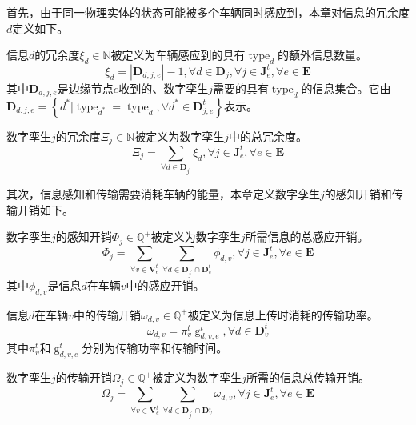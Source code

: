 首先，由于同一物理实体的状态可能被多个车辆同时感应到，本章对信息的冗余度$d$定义如下。
\begin{definition}
信息$d$的冗余度$\xi_d \in \mathbb{N}$被定义为车辆感应到的具有$\operatorname{type}_d$的额外信息数量。
\begin{equation}
    \xi_d= \left | \mathbf{D}_{d, j, e} \right| - 1, \forall d \in \mathbf{D}_j, \forall j \in \mathbf{J}_{e}^{t}, \forall e \in \mathbf{E}
\end{equation}
\noindent 其中$\mathbf{D}_{d, j, e}$是边缘节点$e$收到的、数字孪生$j$需要的具有$\operatorname{type}_d$的信息集合。它由$\mathbf{D}_{d, j, e}=\left\{ d^* \vert \operatorname{type}_{d^*} = \operatorname{type}_{d}, \forall d^* \in \mathbf{D}_{j, e}^t \right \}$表示。

\end{definition}
\begin{definition}
数字孪生$j$的冗余度$\Xi_j \in \mathbb{N}$被定义为数字孪生$j$中的总冗余度。
	\begin{equation}
       \Xi_j =  \sum_{\forall d \in \mathbf{D}_{j^{\prime}}} \xi_d, \forall j \in \mathbf{J}_{e}^{t}, \forall e \in \mathbf{E}
       \label{equ 5-20}
    \end{equation}
\end{definition}

其次，信息感知和传输需要消耗车辆的能量，本章定义数字孪生$j$的感知开销和传输开销如下。
\begin{definition}
数字孪生$j$的感知开销$\Phi_{j} \in \mathbb{Q}^{+}$被定义为数字孪生$j$所需信息的总感应开销。
	\begin{equation}
        \Phi_{j} = \sum_{\forall v \in \mathbf{V}_{e}^{t}} \sum_{\forall d \in \mathbf{D}_{j^{\prime}} \cap \mathbf{D}_v^t}{\phi_{d, v}}, \forall j \in \mathbf{J}_{e}^t, \forall e \in \mathbf{E}
        \label{equ 5-21}
    \end{equation}
    其中$\phi_{d, v}$是信息$d$在车辆$v$中的感应开销。
\end{definition}
\begin{definition}
信息$d$在车辆$v$中的传输开销${\omega}_{d, v} \in \mathbb{Q}^{+}$被定义为信息上传时消耗的传输功率。
\begin{equation}
    {\omega}_{d, v}= \pi_v^t \operatorname{g}_{d, v, e}^t, \forall d \in \mathbf{D}_v^t
\end{equation}
其中$\pi_v^t$和$\operatorname{g}_{d, v, e}^t$分别为传输功率和传输时间。
\end{definition}
\begin{definition}
数字孪生$j$的传输开销$\Omega_{j} \in \mathbb{Q}^{+}$被定义为数字孪生$j$所需的信息总传输开销。
	\begin{equation}
        \Omega_{j} = \sum_{\forall v \in \mathbf{V}_{e}^{t}} \sum_{\forall d \in \mathbf{D}_{j^{\prime}} \cap \mathbf{D}_v^t} {\omega}_{d, v}, \forall j \in \mathbf{J}_{e}^t, \forall e \in \mathbf{E}
       	\label{equ 5-23}
    \end{equation}
\end{definition}

